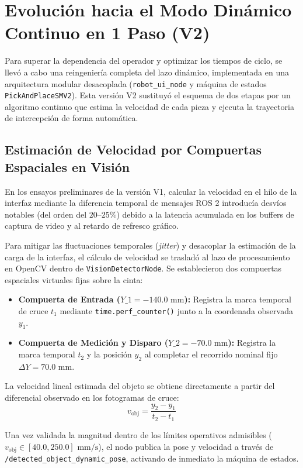 \documentclass[12pt, a4paper]{report}
\begin{document}
\section{Evolución hacia el Modo Dinámico Continuo en 1 Paso (V2)}
Para superar la dependencia del operador y optimizar los tiempos de ciclo, se llevó a cabo una reingeniería completa del lazo dinámico, implementada en una arquitectura modular desacoplada (\texttt{robot\_ui\_node} y máquina de estados \texttt{PickAndPlaceSMV2}). Esta versión V2 sustituyó el esquema de dos etapas por un algoritmo continuo que estima la velocidad de cada pieza y ejecuta la trayectoria de intercepción de forma automática.

\subsection{Estimación de Velocidad por Compuertas Espaciales en Visión}
En los ensayos preliminares de la versión V1, calcular la velocidad en el hilo de la interfaz mediante la diferencia temporal de mensajes ROS 2 introducía desvíos notables (del orden del $20\text{--}25\%$) debido a la latencia acumulada en los buffers de captura de video y al retardo de refresco gráfico.

Para mitigar las fluctuaciones temporales (\textit{jitter}) y desacoplar la estimación de la carga de la interfaz, el cálculo de velocidad se trasladó al lazo de procesamiento en OpenCV dentro de \texttt{VisionDetectorNode}. Se establecieron dos compuertas espaciales virtuales fijas sobre la cinta:
\begin{itemize}
    \item \textbf{Compuerta de Entrada ($Y\_1 = -140.0\text{ mm}$):} Registra la marca temporal de cruce $t_1$ mediante \texttt{time.perf\_counter()} junto a la coordenada observada $y_1$.
    \item \textbf{Compuerta de Medición y Disparo ($Y\_2 = -70.0\text{ mm}$):} Registra la marca temporal $t_2$ y la posición $y_2$ al completar el recorrido nominal fijo $\Delta Y = 70.0\text{ mm}$.
\end{itemize}

La velocidad lineal estimada del objeto se obtiene directamente a partir del diferencial observado en los fotogramas de cruce:
\begin{equation}
    v_{\text{obj}} = \frac{y_2 - y_1}{t_2 - t_1}
\end{equation}

Una vez validada la magnitud dentro de los límites operativos admisibles ($v_{\text{obj}} \in [40.0, 250.0]\text{ mm/s}$), el nodo publica la pose y velocidad a través de \texttt{/detected\_object\_dynamic\_pose}, activando de inmediato la máquina de estados.
\end{document}
